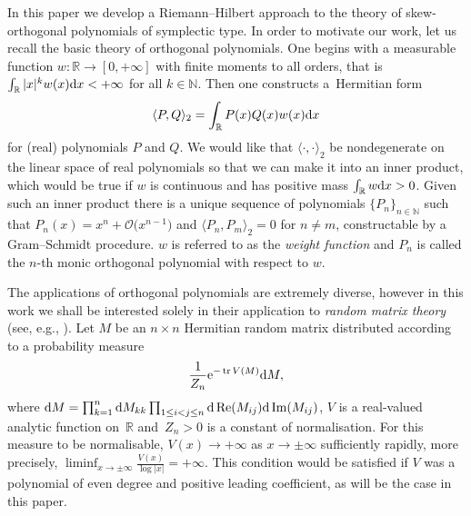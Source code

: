 \documentclass[pdftex]{sigma}
\numberwithin{equation}{section}
\begin{document}
In this paper we develop a Riemann--Hilbert approach to the theory of skew-orthogonal polynomials of symplectic type. In order to motivate our work, let us recall the basic theory of orthogonal polynomials. One begins with a measurable function $w \colon \mathbb{R}\longrightarrow [0,+\infty]$ with finite moments to all orders, that is $\int_\mathbb{R} |x|^k w(x) {\rm d}x < +\infty$ for all $k \in \mathbb{N}$. Then one constructs a~Hermitian form
\begin{equation*}
\langle P, Q \rangle_2 = \int_\mathbb{R} P(x)Q(x) w(x) {\rm d}x
\end{equation*}
for (real) polynomials $P$ and $Q$. We would like that $\langle \cdot , \cdot \rangle_2$ be nondegenerate on the linear space of real polynomials so that we can make it into an inner product, which would be true if $w$ is continuous and has positive mass $\int_\mathbb{R} w {\rm d}x > 0$. Given such an inner product there is a unique sequence of polynomials $\{ P_n \}_{n \in \mathbb{N}}$ such that $P_n(x) = x^n + \mathcal{O}\big(x^{n-1}\big)$ and $\langle P_n , P_m \rangle_2 = 0$ for $n \neq m$, constructable by a Gram--Schmidt procedure. $w$ is referred to as the \textit{weight function} and $P_n$ is called the $n$-th monic orthogonal polynomial with respect to $w$.

The applications of orthogonal polynomials are extremely diverse, however in this work we shall be interested solely in their application to \textit{random matrix theory} (see, e.g., \cite{deiftbook}). Let $M$ be an $n\times n$ Hermitian random matrix distributed according to a probability measure
\begin{equation}\label{probmeas}
\frac{1}{Z_n} {\rm e}^{- \operatorname{tr} V(M)} {\rm d}M,
\end{equation}
where ${\rm d}M = \prod_{k=1}^n {\rm d}M_{kk} \prod_{1 \leq i < j \leq n} {\rm d} \operatorname{Re} (M_{ij}) {\rm d} \operatorname{Im} (M_{ij})$, $V$ is a real-valued analytic function on~$\mathbb{R}$ and~${Z_n\! > 0}$ is a constant of normalisation. For this measure to be normalisable, ${V(x) \to +\infty}$ as $x \to \pm \infty$ sufficiently rapidly, more precisely, $\liminf_{x \to \pm \infty} \frac{V(x)}{\log|x|} = +\infty$. This condition would be satisfied if $V$ was a polynomial of even degree and positive leading coefficient, as will be the case in this paper.
\end{document}
